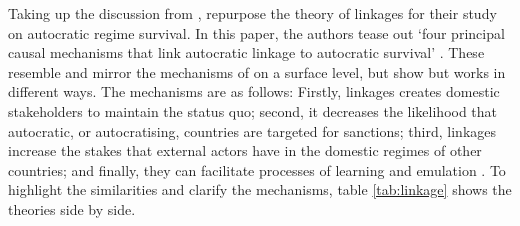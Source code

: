 Taking up the discussion from \citeauthor{levitsky_linkage_2006}, \citet{tansey_ties_2017} repurpose the theory of linkages for their study on autocratic regime survival. In this paper, the authors tease out `four principal causal mechanisms that link autocratic linkage to autocratic survival' \citep[p. 1225]{tansey_ties_2017}. These resemble and mirror the mechanisms of \citeauthor{levitsky_linkage_2006} on a surface level, but show but works in different ways. The mechanisms are as follows: Firstly, linkages creates domestic stakeholders to maintain the status quo; second, it decreases the likelihood that autocratic, or autocratising, countries are targeted for sanctions; third, linkages increase the stakes that external actors have in the domestic regimes of other countries; and finally, they can facilitate processes of learning and emulation \citep[pp. 1225-1227]{tansey_ties_2017}. To highlight the similarities and clarify the mechanisms, table \ref{tab:linkage} shows the theories side by side. 

